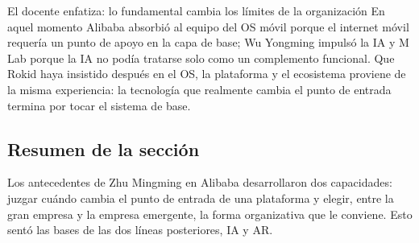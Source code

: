 \begin{importantbox}{El docente enfatiza: lo fundamental cambia los límites de la organización}
En aquel momento Alibaba absorbió al equipo del OS móvil porque el internet móvil requería un punto de apoyo en la capa de base; Wu Yongming impulsó la IA y M Lab porque la IA no podía tratarse solo como un complemento funcional. Que Rokid haya insistido después en el OS, la plataforma y el ecosistema proviene de la misma experiencia: la tecnología que realmente cambia el punto de entrada termina por tocar el sistema de base.
\end{importantbox}

\subsection{Resumen de la sección}

Los antecedentes de Zhu Mingming en Alibaba desarrollaron dos capacidades: juzgar cuándo cambia el punto de entrada de una plataforma y elegir, entre la gran empresa y la empresa emergente, la forma organizativa que le conviene. Esto sentó las bases de las dos líneas posteriores, IA y AR.
